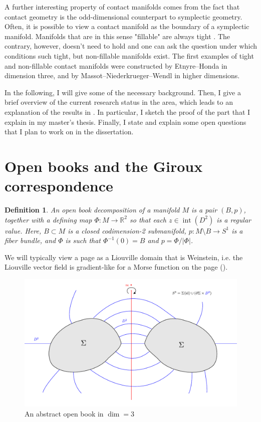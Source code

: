 \documentclass{amsart}
\newtheorem{definition}{Definition}
\begin{document}
A further interesting property of contact manifolds comes from the fact that contact geometry is the odd-dimensional counterpart to symplectic geometry. Often, it is possible to view a contact manifold as the boundary of a symplectic manifold. Manifolds that are in this sense "fillable" are always tight \cite{Gromov85,Eliashberg91}.
The contrary, however, doesn't need to hold and one can ask the question under which conditions such tight, but non-fillable manifolds exist. The first examples of tight and non-fillable contact manifolds were constructed by Etnyre--Honda \cite{EH02} in dimension three, and by Massot--Niederkrueger--Wendl \cite{MNW13} in higher dimensions.


In the following, I will give some of the necessary background.
Then, I give a brief overview of the current research status in the area, which leads
to an explanation of the results in \cite{BGMZ22}.
In particular, I sketch the proof of the part that I explain in my master's thesis. 
Finally, I state and explain some open questions that I plan to work on in the dissertation.

\section*{Open books and the Giroux correspondence}
\begin{definition}
    An open book decomposition of a manifold $M$ is a pair $(B, p)$, together with a defining map $\Phi:M \to \mathbb R^2$ so that each $z \in \operatorname{int}(D^2)$ is a regular value.
    Here, $B \subset M$ is a closed codimension-2 submanifold, $p: M\setminus B \to S^1$ is a fiber bundle, and $\Phi$ is such that $\Phi^{-1}(0) = B$ and $p =  \Phi / |\Phi|$.
\end{definition}
We will typically view a page as a Liouville domain that is Weinstein, i.e. the Liouville vector field is gradient-like for a Morse function on the page (\cite[Def 1.1.2]{BHH23}).


\begin{figure}
    \includegraphics*[width=\textwidth]{../document/images/abstract_open_book.pdf}
    \caption{An abstract open book in $\dim = 3$}
    \label{fig:abstract_open_book}
\end{figure}
\end{document}
